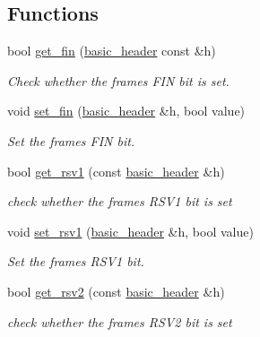 \subsection*{Functions}
\begin{DoxyCompactItemize}
\item 
bool \mbox{\hyperlink{namespacewebsocketpp_1_1frame_a66b39e273681d8509128e420cfaef6b0}{get\+\_\+fin}} (\mbox{\hyperlink{structwebsocketpp_1_1frame_1_1basic__header}{basic\+\_\+header}} const \&h)
\begin{DoxyCompactList}\small\item\em Check whether the frame\textquotesingle{}s F\+IN bit is set. \end{DoxyCompactList}\item 
void \mbox{\hyperlink{namespacewebsocketpp_1_1frame_abe746242507916e5d6ae2ca26bd9f69e}{set\+\_\+fin}} (\mbox{\hyperlink{structwebsocketpp_1_1frame_1_1basic__header}{basic\+\_\+header}} \&h, bool value)
\begin{DoxyCompactList}\small\item\em Set the frame\textquotesingle{}s F\+IN bit. \end{DoxyCompactList}\item 
bool \mbox{\hyperlink{namespacewebsocketpp_1_1frame_a90556de9dd71c1f063153b791abeb81c}{get\+\_\+rsv1}} (const \mbox{\hyperlink{structwebsocketpp_1_1frame_1_1basic__header}{basic\+\_\+header}} \&h)
\begin{DoxyCompactList}\small\item\em check whether the frame\textquotesingle{}s R\+S\+V1 bit is set \end{DoxyCompactList}\item 
void \mbox{\hyperlink{namespacewebsocketpp_1_1frame_ab706b1d5ef7de377671547993eb35062}{set\+\_\+rsv1}} (\mbox{\hyperlink{structwebsocketpp_1_1frame_1_1basic__header}{basic\+\_\+header}} \&h, bool value)
\begin{DoxyCompactList}\small\item\em Set the frame\textquotesingle{}s R\+S\+V1 bit. \end{DoxyCompactList}\item 
bool \mbox{\hyperlink{namespacewebsocketpp_1_1frame_a531509bc14ee0a6641662b17d5670460}{get\+\_\+rsv2}} (const \mbox{\hyperlink{structwebsocketpp_1_1frame_1_1basic__header}{basic\+\_\+header}} \&h)
\begin{DoxyCompactList}\small\item\em check whether the frame\textquotesingle{}s R\+S\+V2 bit is set \end{DoxyCompactList}\item 

\end{DoxyCompactItemize}
